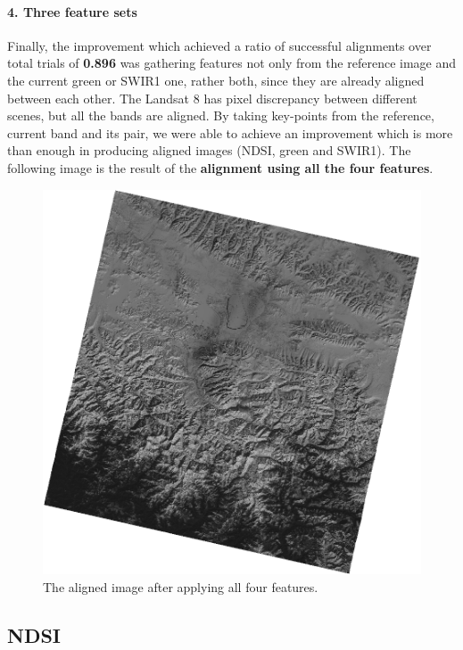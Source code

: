 \documentclass[12pt, a4paper]{report}
\begin{document}
	\paragraph{4. Three feature sets} Finally, the improvement which achieved a ratio of successful alignments over total trials of \textbf{0.896} was gathering features not only from the reference image and the current green or SWIR1 one, rather both, since they are already aligned between each other. The Landsat 8 has pixel discrepancy between different scenes, but all the bands are aligned. By taking key-points from the reference, current band and its pair, we were able to achieve an improvement which is more than enough in producing aligned images (NDSI, green and SWIR1). The following image is the result of the \textbf{alignment using all the four features}.
	
	\begin{figure}[H]
		\centering
		\includegraphics[scale=0.3]{matches_3.png}
		\caption{The aligned image after applying all four features.}
		\label{fig:bad_matches_3}
	\end{figure}
	
	\subsection{NDSI}
	
\end{document}
